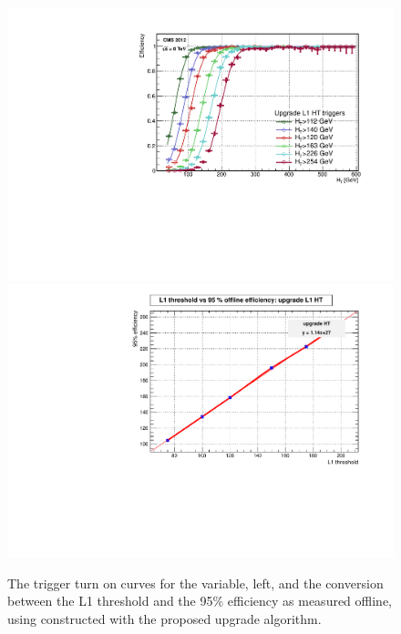 \begin{figure}[t!]
\begin{center}
  \includegraphics[scale=0.37]{Figures/l1jets/UpgradeL1HTTriggersfixed.pdf}
  \includegraphics[scale=0.37]{Figures/l1jets/upgradeHTconv.pdf}
\caption{The trigger turn on curves for the \HT variable, left, and the conversion between the \ac{L1} \HT threshold and the 95\% efficiency as measured offline, using \HT constructed with the proposed upgrade algorithm. }
\label{HTRate_conv}
\end{center}
\end{figure}

